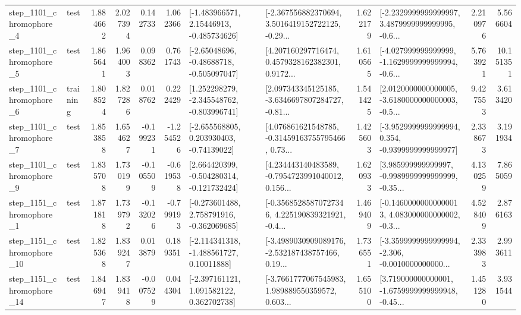 \begin{tabular}{llrrrrllrlrr}
  step\_1101\_chromophore\_4 &      test &      1.884662 &    2.027394 &      0.142733 &  1.062366 &    [-1.483966571, 2.15446913, -0.485734626] &  [-2.367556882370694, 3.5016419152722125, -0.29... &       1.622179 &  [-2.2329999999999997, 3.4879999999999995, -0.6... &            2.210976 &          5.566604 \\
  step\_1101\_chromophore\_5 &      test &      1.865641 &    1.964003 &      0.098362 &  0.761743 &    [-2.65048696, -0.48688718, -0.505097047] &  [4.207160297716474, 0.4579328162382301, 0.9172... &       1.610565 &  [-4.027999999999999, -1.1629999999999994, -0.6... &            5.763921 &         10.151351 \\
  step\_1101\_chromophore\_6 &  training &      1.808524 &    1.827286 &      0.018762 &  0.222429 &   [1.252298279, -2.345548762, -0.803996741] &  [2.097343345125185, -3.6346697807284727, -0.81... &       1.541425 &  [2.0120000000000005, -3.6180000000000003, -0.5... &            9.427553 &          3.613420 \\
  step\_1101\_chromophore\_7 &      test &      1.853858 &    1.654627 &     -0.199231 & -1.254526 &    [-2.655568805, 0.203930403, -0.74139022] &  [4.076861621548785, -0.31459163755795466, 0.73... &       1.425603 &  [-3.9529999999999994, 0.354, -0.9399999999999977] &            2.338673 &          3.191934 \\
  step\_1101\_chromophore\_9 &      test &      1.835708 &    1.730199 &     -0.105509 & -0.619538 &   [2.664420399, -0.504280314, -0.121732424] &  [4.234443140483589, -0.7954723991040012, 0.156... &       1.620933 &  [3.985999999999997, -0.9989999999999999, -0.35... &            4.130259 &          7.865059 \\
  step\_1151\_chromophore\_1 &      test &      1.871818 &    1.739792 &     -0.132026 & -0.799193 &   [-0.273601488, 2.758791916, -0.362069685] &  [-0.35685285870727346, 4.225190839321921, -0.4... &       1.469409 &  [-0.14600000000000013, 4.083000000000002, -0.3... &            4.528409 &          2.876163 \\
 step\_1151\_chromophore\_10 &      test &      1.825368 &    1.839247 &      0.013879 &  0.189351 &    [-2.114341318, -1.488561727, 0.10011888] &  [-3.4989030909089176, -2.532187438757466, 0.19... &       1.736551 &  [-3.3599999999999994, -2.306, -0.0010000000000... &            2.333983 &          2.993611 \\
 step\_1151\_chromophore\_14 &      test &      1.846947 &    1.839418 &     -0.007529 &  0.044304 &    [-2.397161121, 1.091582122, 0.362702738] &  [-3.7661777067545983, 1.989889550359572, 0.603... &       1.655100 &  [3.719000000000001, -1.6759999999999948, -0.45... &            1.451280 &          3.931544 \\

\end{tabular}
